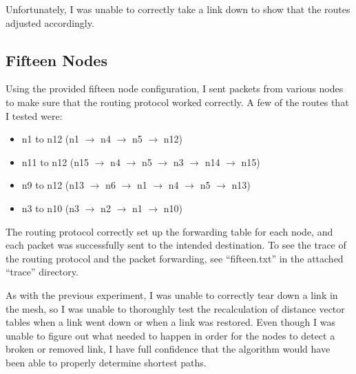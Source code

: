 \documentclass[11pt]{article}
\begin{document}
Unfortunately, I was unable to correctly take a link down to show that the routes adjusted accordingly.

\subsection{Fifteen Nodes}
Using the provided fifteen node configuration, I sent packets from various nodes to make sure that the routing protocol worked correctly. A few of the routes that I tested were:
\begin{itemize}
  \item n1 to n12 (n1 $\rightarrow$ n4 $\rightarrow$ n5 $\rightarrow$ n12)
  \item n11 to n12 (n15 $\rightarrow$ n4 $\rightarrow$ n5 $\rightarrow$ n3 $\rightarrow$ n14 $\rightarrow$ n15)
  \item n9 to n12 (n13 $\rightarrow$ n6 $\rightarrow$ n1 $\rightarrow$ n4 $\rightarrow$ n5 $\rightarrow$ n13)
  \item n3 to n10 (n3 $\rightarrow$ n2 $\rightarrow$ n1 $\rightarrow$ n10)
\end{itemize}
The routing protocol correctly set up the forwarding table for each node, and each packet was successfully sent to the intended destination. To see the trace of the routing protocol and the packet forwarding, see ``fifteen.txt'' in the attached ``trace'' directory.

As with the previous experiment, I was unable to correctly tear down a link in the mesh, so I was unable to thoroughly test the recalculation of distance vector tables when a link went down or when a link was restored. Even though I was unable to figure out what needed to happen in order for the nodes to detect a broken or removed link, I have full confidence that the algorithm would have been able to properly determine shortest paths.

\vspace{0.5cm}
\end{document}
